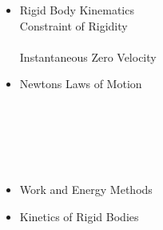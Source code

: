 \documentclass[11pt]{article}
\begin{document}
\begin{itemize}
\newpage
			\item Rigid Body Kinematics \\

			Constraint of Rigidity\\

			 \vspace{2mm}\\

			Instantaneous Zero Velocity \\


			\item Newtons Laws of Motion \\

				\\

				 \\\\

				 \\\\

			\item Work and Energy Methods
			\item Kinetics of Rigid Bodies
		\end{itemize}
\newpage
\end{document}
